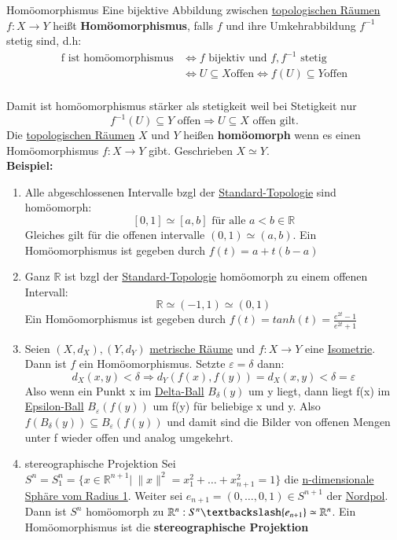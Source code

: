 \begin{titleDef}{Homöomorphismus}
\label{homoemorph}
Eine bijektive Abbildung zwischen \hyperref[Topologie]{topologischen Räumen} $f:X\to Y$ heißt \textbf{Homöomorphismus}, falls $f$ und ihre Umkehrabbildung $f^{-1}$ stetig sind, d.h:
\begin{align*}
    \text{f ist homöomorphismus}&\Longleftrightarrow f\text{ bijektiv und }f,f^{-1}\text{ stetig}\\
    &\Longleftrightarrow U\subseteq X\text{offen}\Longleftrightarrow f(U)\subseteq Y\text{offen}
\end{align*}\\
Damit ist homöomorphismus stärker als stetigkeit weil bei Stetigkeit nur $$f^{-1}(U)\subseteq Y\text{ offen}\Rightarrow U\subseteq X\text{ offen gilt.}$$
Die \hyperref[Topologie]{topologischen Räumen} $X$ und $Y$ heißen \textbf{homöomorph} wenn es einen Homöomorphismus $f:X\to Y$ gibt. Geschrieben $X\simeq Y$.\\
\textbf{Beispiel:}
\listbsp
\begin{enumerate}
    \item Alle abgeschlossenen Intervalle bzgl der \hyperref[stdTopo]{Standard-Topologie} sind homöomorph:
    $$[0,1]\simeq [a,b]\text{ für alle }a<b\in\mathbb{R}$$
    Gleiches gilt für die offenen intervalle $(0,1)\simeq (a,b)$. Ein Homöomorphismus ist gegeben durch $f(t)=a+t(b-a)$
    \item Ganz $\mathbb{R}$ ist bzgl der \hyperref[stdTopo]{Standard-Topologie} homöomorph zu einem offenen Intervall:
    $$\mathbb{R}\simeq(-1,1)\simeq(0,1)$$
    Ein Homöomorphismus ist gegeben durch $f(t)=tanh(t)=\frac{e^{2t}-1}{e^{2t}+1}$
    \item Seien $(X,d_X),(Y,d_Y)$ \hyperref[MetrischerRaum]{metrische Räume} und $f:X\to Y$ eine \hyperref[Isometrie]{Isometrie}. Dann ist $f$ ein Homöomorphismus. Setzte $\varepsilon=\delta$ dann:
    $$d_X(x,y)<\delta \Rightarrow d_Y(f(x),f(y))=d_X(x,y)<\delta=\varepsilon$$
    Also wenn ein Punkt x im \hyperref[balloffen]{Delta-Ball} $B_{\delta}(y)$ um y liegt, dann liegt f(x) im \hyperref[balloffen]{Epsilon-Ball} $B_{\varepsilon}(f(y))$ um f(y) für beliebige x und y. Also $f(B_{\delta}(y))\subseteq B_{\varepsilon}(f(y))$ und damit sind die Bilder von offenen Mengen unter f wieder offen und analog umgekehrt.
    \item \begin{titleDef}{stereographische Projektion}
    \label{stereoproj}
    Sei $S^n=S^n_1=\{x\in\mathbb{R}^{n+1}|\ \lVert x\rVert^2=x_1^2+\dots+x_{n+1}^2=1\}$ die \hyperref[ndimsphere]{n-dimensionale Sphäre vom Radius 1}. Weiter sei $e_{n+1}=(0,\ldots,0,1)\in S^{n+1}$ der \hyperref[pol]{Nordpol}. Dann ist $S^n$ homöomorph zu $\mathbb{R}^n:S^n\textbackslash\{e_{n+1}\}\simeq\mathbb{R}^n$. Ein Homöomorphismus ist die \textbf{stereographische Projektion}

\end{titleDef}
\end{enumerate}
\end{titleDef}
